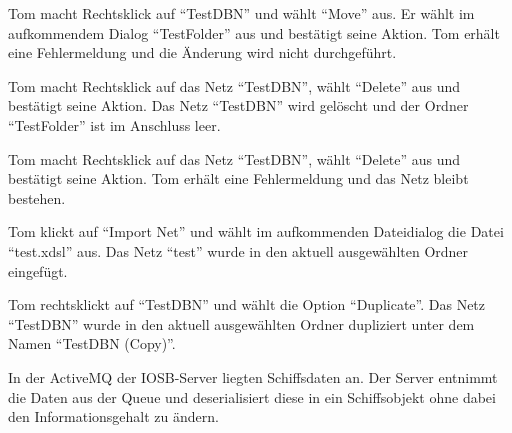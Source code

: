 \documentclass[parskip=full,11pt,twoside]{scrartcl}
\begin{document}
{Tom macht Rechtsklick auf \enquote{TestDBN} und wählt \enquote{Move} aus. Er wählt im aufkommendem Dialog \enquote{TestFolder} aus und bestätigt seine Aktion.}
{Tom erhält eine Fehlermeldung und die Änderung wird nicht durchgeführt.}

{Tom macht Rechtsklick auf das Netz \enquote{TestDBN}, wählt \enquote{Delete} aus und bestätigt seine Aktion.}
{Das Netz \enquote{TestDBN} wird gelöscht und der Ordner \enquote{TestFolder} ist im Anschluss leer.}

{Tom macht Rechtsklick auf das Netz \enquote{TestDBN}, wählt \enquote{Delete} aus und bestätigt seine Aktion.}
{Tom erhält eine Fehlermeldung und das Netz bleibt bestehen.}

{Tom klickt auf \enquote{Import Net} und wählt im aufkommenden Dateidialog die Datei \enquote{test.xdsl} aus.}
{Das Netz \enquote{test} wurde in den aktuell ausgewählten Ordner eingefügt.}

{Tom rechtsklickt auf \enquote{TestDBN} und wählt die Option \enquote{Duplicate}.}
{Das Netz \enquote{TestDBN} wurde in den aktuell ausgewählten Ordner dupliziert unter dem Namen \enquote{TestDBN (Copy)}.}



{In der ActiveMQ der IOSB-Server liegten Schiffsdaten an.}
{Der Server entnimmt die Daten aus der Queue und deserialisiert diese in ein Schiffsobjekt ohne dabei den Informationsgehalt zu ändern.}
\end{document}
